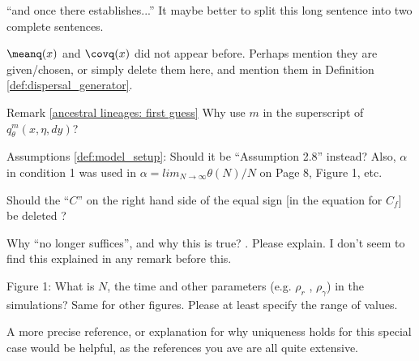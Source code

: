 \begin{point}{\revref}
``and once there establishes...'' It maybe better to split this
long sentence into two complete sentences.
\end{point}

\reply{
}

\begin{point}{\revref}
$\meanq(x)$ and $\covq(x)$ did not appear before. Perhaps mention they
are given/chosen, or simply delete them here, and mention them in Definition \ref{def:dispersal_generator}.
\end{point}

\reply{
}

\begin{point}{\revref}
Remark \ref{ancestral lineages: first guess}
Why use $m$ in the superscript of $q_\theta^m(x, \eta, dy)$?
\end{point}

\reply{
}

\begin{point}{}
Assumptions \ref{def:model_setup}: Should it be ``Assumption 2.8'' instead? Also, $\alpha$ in condition 1 was
used in $\alpha = lim_{N \to \infty} \theta(N)/N$ on Page 8, Figure 1, etc.
\end{point}

\reply{
}

\begin{point}{\revref}
    Should the ``$C$'' on the right hand side of the equal sign [in the equation for $C_f$] be deleted ?
\end{point}

\reply{
}

\begin{point}{\revref}
    Why ``no longer suffices'', and why this is true? . Please
explain. I don’t seem to find this explained in any remark before this.
\end{point}

\reply{
}

\begin{point}{}
Figure 1: What is $N$, the time and other parameters (e.g. $\rho_r$ , $\rho_\gamma$) in the simulations? Same
for other figures. Please at least specify the range of values.
\end{point}

\reply{
}

\begin{point}{\revref}
A more precise reference, or explanation for why
uniqueness holds for this special case would be helpful, as the references you ave are all
quite extensive.
\end{point}

